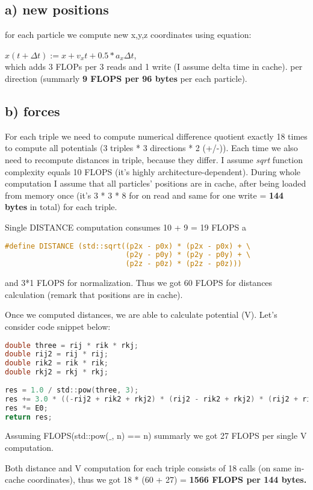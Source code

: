 \documentclass[12pt]{article}
\begin{document}
\subsection*{a) new positions}

for each particle we compute new x,y,z coordinates using equation:

$x(t + \Delta t) := x + v_x t + 0.5*a_x \Delta t$,\\
which adds 3 FLOPs per 3 reads and 1 write (I assume delta time in cache). per direction (summarly \textbf{9 FLOPS per 96 bytes} per each particle).

\subsection*{b) forces}
For each triple we need to compute numerical difference quotient exactly 18 times to compute all potentials (3 triples * 3 directions * 2 (+/-)). Each time we also need to recompute distances in triple, because they differ. I assume \textit{sqrt} function complexity equals 10 FLOPS (it's highly architecture-dependent). During whole computation I assume that all particles' positions are in cache, after being loaded from memory once (it's 3 * 3 * 8 for on read and same for one write = \textbf{144 bytes} in total) for each triple.

Single DISTANCE computation consumes 10 + 9 = 19 FLOPS a 
\begin{lstlisting}[language=C]
   #define DISTANCE (std::sqrt((p2x - p0x) * (p2x - p0x) + \
                            (p2y - p0y) * (p2y - p0y) + \
                            (p2z - p0z) * (p2z - p0z)))
\end{lstlisting}
and 3*1 FLOPS for normalization.
Thus we got 60 FLOPS for distances calculation (remark that positions are in cache).

Once we computed distances, we are able to calculate potential (V). Let's consider code snippet below:
\begin{lstlisting}[language=C]
double three = rij * rik * rkj;
double rij2 = rij * rij;
double rik2 = rik * rik;
double rkj2 = rkj * rkj;
    
res = 1.0 / std::pow(three, 3);
res += 3.0 * ((-rij2 + rik2 + rkj2) * (rij2 - rik2 + rkj2) * (rij2 + rik2 - rkj2)) / (8.0 * std::pow(three, 5));
res *= E0;
return res;
\end{lstlisting}
Assuming FLOPS(std::pow($\_$, n) == n) summarly we got 27 FLOPS per single V computation.

Both distance and V computation for each triple consists of 18 calls (on same in-cache coordinates), thus we got 18 * (60 + 27) = \textbf{1566 FLOPS per 144 bytes.}
\end{document}
